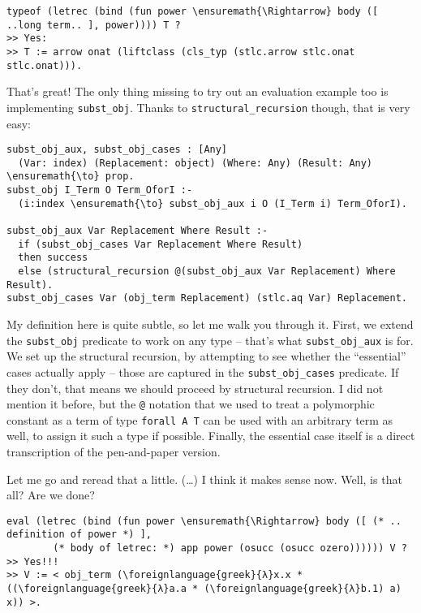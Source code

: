 \begin{verbatim}
typeof (letrec (bind (fun power \ensuremath{\Rightarrow} body ([ ..long term.. ], power)))) T ?
>> Yes:
>> T := arrow onat (liftclass (cls_typ (stlc.arrow stlc.onat stlc.onat))).
\end{verbatim}

\heroADVISOR{} That's great! The only thing missing to try out an evaluation
example too is implementing \texttt{subst\_obj}. Thanks to
\texttt{structural\_recursion} though, that is very easy:

\begin{verbatim}
subst_obj_aux, subst_obj_cases : [Any]
  (Var: index) (Replacement: object) (Where: Any) (Result: Any) \ensuremath{\to} prop.
subst_obj I_Term O Term_OforI :-
  (i:index \ensuremath{\to} subst_obj_aux i O (I_Term i) Term_OforI).

subst_obj_aux Var Replacement Where Result :-
  if (subst_obj_cases Var Replacement Where Result)
  then success
  else (structural_recursion @(subst_obj_aux Var Replacement) Where Result).
subst_obj_cases Var (obj_term Replacement) (stlc.aq Var) Replacement.
\end{verbatim}

\noindent
My definition here is quite subtle, so let me walk you through it.
First, we extend the \texttt{subst\_obj} predicate to work on any type
-- that's what \texttt{subst\_obj\_aux} is for. We set up the structural
recursion, by attempting to see whether the ``essential'' cases actually
apply -- those are captured in the \texttt{subst\_obj\_cases} predicate.
If they don't, that means we should proceed by structural recursion. I
did not mention it before, but the \texttt{@} notation that we used to
treat a polymorphic constant as a term of type \texttt{forall\ A\ T} can
be used with an arbitrary term as well, to assign it such a type if
possible. Finally, the essential case itself is a direct transcription
of the pen-and-paper version.

\heroSTUDENT{} Let me go and reread that a little. (\ldots{}) I think it makes
sense now. Well, is that all? Are we done?

\begin{verbatim}
eval (letrec (bind (fun power \ensuremath{\Rightarrow} body ([ (* .. definition of power *) ],
        (* body of letrec: *) app power (osucc (osucc ozero)))))) V ?
>> Yes!!!
>> V := < obj_term (\foreignlanguage{greek}{λ}x.x * ((\foreignlanguage{greek}{λ}a.a * (\foreignlanguage{greek}{λ}b.1) a) x)) >.
\end{verbatim}

